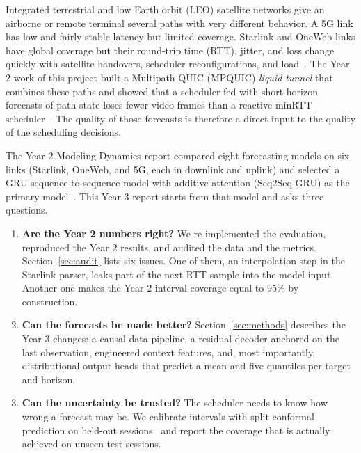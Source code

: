Integrated terrestrial and low Earth orbit (LEO) satellite networks give an airborne or remote terminal several paths with very different behavior. A 5G link has low and fairly stable latency but limited coverage. Starlink and OneWeb links have global coverage but their round-trip time (RTT), jitter, and loss change quickly with satellite handovers, scheduler reconfigurations, and load~\cite{michel2022first,mohan2024multifaceted}. The Year 2 work of this project built a Multipath QUIC (MPQUIC) \emph{liquid tunnel} that combines these paths and showed that a scheduler fed with short-horizon forecasts of path state loses fewer video frames than a reactive minRTT scheduler~\cite{deconinck2017multipath}. The quality of those forecasts is therefore a direct input to the quality of the scheduling decisions.

The Year 2 Modeling Dynamics report compared eight forecasting models on six links (Starlink, OneWeb, and 5G, each in downlink and uplink) and selected a GRU sequence-to-sequence model with additive attention (Seq2Seq-GRU) as the primary model~\cite{cho2014learning,bahdanau2015neural}. This Year 3 report starts from that model and asks three questions.
\begin{enumerate}[leftmargin=*]
  \item \textbf{Are the Year 2 numbers right?} We re-implemented the evaluation, reproduced the Year 2 results, and audited the data and the metrics. Section~\ref{sec:audit} lists six issues. One of them, an interpolation step in the Starlink parser, leaks part of the next RTT sample into the model input. Another one makes the Year 2 interval coverage equal to 95\% by construction.
  \item \textbf{Can the forecasts be made better?} Section~\ref{sec:methods} describes the Year 3 changes: a causal data pipeline, a residual decoder anchored on the last observation, engineered context features, and, most importantly, distributional output heads that predict a mean and five quantiles per target and horizon.
  \item \textbf{Can the uncertainty be trusted?} The scheduler needs to know how wrong a forecast may be. We calibrate intervals with split conformal prediction on held-out sessions~\cite{lei2018distribution,romano2019conformalized} and report the coverage that is actually achieved on unseen test sessions.
\end{enumerate}

